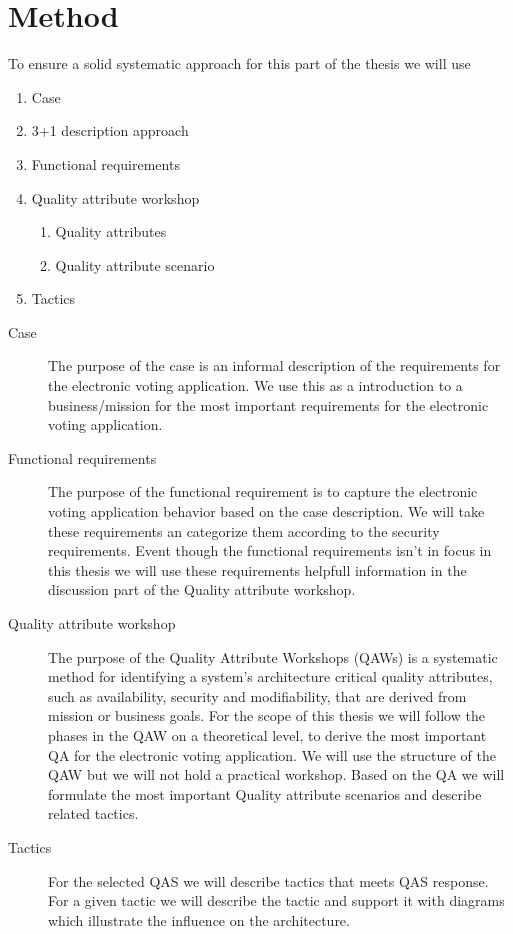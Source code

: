 \section{Method}
To ensure a solid systematic approach for this part of the thesis we will use


\begin{enumerate}
    \item Case
    \item 3+1 description approach
    \item Functional requirements
    \item Quality attribute workshop
        \begin{enumerate}
            \item Quality attributes
            \item Quality attribute scenario
        \end{enumerate}
    \item Tactics
\end{enumerate}


\begin{description}
    \item[Case] The purpose of the case is an informal description of the requirements for the electronic voting application. We use this as a introduction to a business/mission for the most important requirements for the electronic voting application.
    
    \item[Functional requirements]  The purpose of the functional requirement is to capture the electronic voting application behavior based on the case description. We will take these requirements an categorize them according to the security requirements. Event though the functional requirements isn't in focus in this thesis we will use these requirements helpfull information in the discussion part of the Quality attribute workshop.  
    
    \item[Quality attribute workshop]  The purpose of the Quality Attribute Workshops (QAWs) is a systematic method for identifying a system's architecture critical quality attributes, such as availability, security and modifiability, that are derived from mission or business goals. For the scope of this thesis we will follow the phases in the QAW on a theoretical level, to derive the most important QA for the electronic voting application. We will use the structure of the QAW but we will not hold a practical workshop.  Based on the QA we will formulate the most important Quality attribute scenarios and describe related tactics.
    
    \item [Tactics] For the selected QAS we will describe tactics that meets QAS response. For a given tactic we will describe the tactic and support it with diagrams which illustrate the influence on the architecture. 

\end{description}

